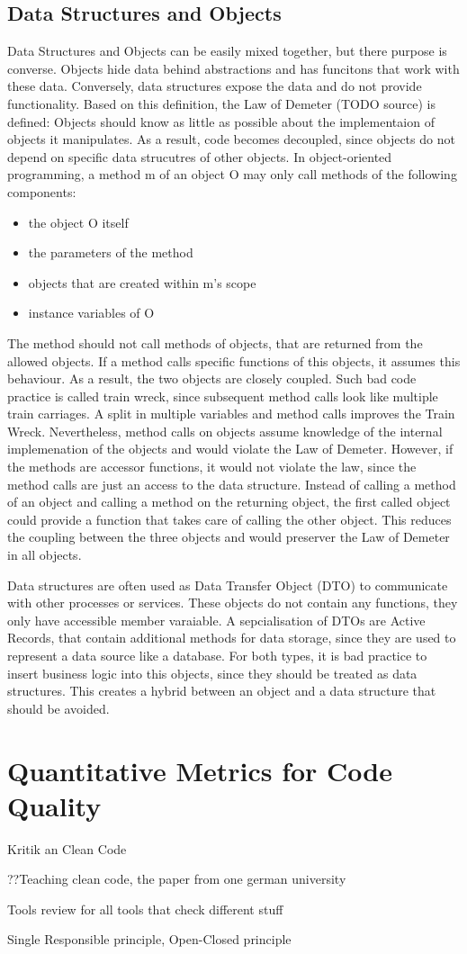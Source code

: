 \subsection{Data Structures and Objects}
Data Structures and Objects can be easily mixed together, but there purpose is converse. Objects hide data behind abstractions and has funcitons that work with these data. Conversely, data structures expose the data and do not provide functionality. Based on this definition, the Law of Demeter (TODO source) is defined: Objects should know as little as possible about the implementaion of objects it manipulates. As a result, code becomes decoupled, since objects do not depend on specific data strucutres of other objects.
In object-oriented programming, a method m of an object O may only call methods of the following components:
\begin{itemize}
    \item the object O itself
    \item the parameters of the method
    \item objects that are created within m's scope
    \item instance variables of O
\end{itemize}
The method should not call methods of objects, that are returned from the allowed objects. If a method calls specific functions of this objects, it assumes this behaviour. As a result, the two objects are closely coupled. 
Such bad code practice is called train wreck, since subsequent method calls look like multiple train carriages. A split in multiple variables and method calls improves the Train Wreck. Nevertheless, method calls on objects assume knowledge of the internal implemenation of the objects and would violate the Law of Demeter. However, if the methods are accessor functions, it would not violate the law, since the method calls are just an access to the data structure. Instead of calling a method of an object and calling a method on the returning object, the first called object could provide a function that takes care of calling the other object. This reduces the coupling between the three objects and would preserver the Law of Demeter in all objects.

Data structures are often used as Data Transfer Object (DTO) to communicate with other processes or services. These objects do not contain any functions, they only have accessible member varaiable. A sepcialisation of DTOs are Active Records, that contain additional methods for data storage, since they are used to represent a data source like a database. For both types, it is bad practice to insert business logic into this objects, since they should be treated as data structures. This creates a hybrid between an object and a data structure that should be avoided.

\section{Quantitative Metrics for Code Quality}

Kritik an Clean Code

??Teaching clean code, the paper from one german university

Tools review for all tools that check different stuff

Single Responsible principle, Open-Closed principle

